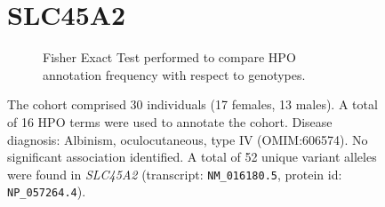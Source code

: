 

\begin{figure}[htbp]
    \section*{SLC45A2}
\centering
\begin{subfigure}[b]{0.95\textwidth}
\centering
{}
\captionsetup{justification=raggedright,singlelinecheck=false}
\caption{Fisher Exact Test performed to compare HPO annotation frequency with respect to genotypes. }
\end{subfigure}

\vspace{2em}

\caption{The cohort comprised 30 individuals (17 females, 13 males). A total of 16 HPO terms were used to annotate the cohort. Disease diagnosis: Albinism, oculocutaneous, type IV (OMIM:606574). No significant association identified. A total of 52 unique variant alleles were found in \textit{SLC45A2} (transcript: \texttt{NM\_016180.5}, protein id: \texttt{NP\_057264.4}).}
\end{figure}
